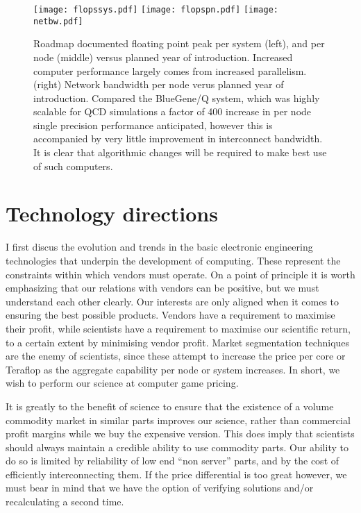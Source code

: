 \documentclass{PoS}
\begin{document}
\begin{figure}[hbt]
\texttt{[image: flopssys.pdf]}
\texttt{[image: flopspn.pdf]}
\texttt{[image: netbw.pdf]}
\caption{ \label{fig:flopssys} Roadmap documented floating point peak per system (left), and per node (middle) versus planned
year of introduction. Increased computer performance largely comes from increased parallelism.
\label{fig:netbw} (right) Network bandwidth per node verus planned year of introduction.
Compared the BlueGene/Q system, which was highly scalable for QCD simulations a factor of 400 increase in per
node single precision performance anticipated, however this is accompanied by very little improvement in interconnect
bandwidth. It is clear that algorithmic changes will be required to make best use of such computers.}
\end{figure}

\section{Technology directions}

I first discus the evolution and trends in the basic electronic engineering technologies that underpin
the development of computing. These represent the constraints within which vendors must operate.
On a point of principle it is worth emphasizing that our relations with vendors can be positive, but
we must understand each other clearly. Our interests are only
aligned when it comes to ensuring the best possible products.
Vendors have a requirement to maximise their profit, while
scientists have a requirement to maximise our scientific return, to a certain extent by minimising vendor profit.
Market segmentation techniques are the enemy of scientists, since these attempt to increase the price per core or Teraflop
as the aggregate capability per node or system increases. In short, we wish to perform our science at computer game pricing.

It is greatly to the benefit of science to ensure that the existence of a volume commodity market in similar
parts improves our science, rather than commercial profit margins while we buy the expensive version. This does imply that scientists
should always maintain a credible ability to use commodity parts. Our ability to do so is limited by reliability of low end 
``non server'' parts, and by the cost of efficiently interconnecting them. If the price differential is too great however,
we must bear in mind that we have the option of verifying solutions and/or recalculating a second time.
\end{document}
